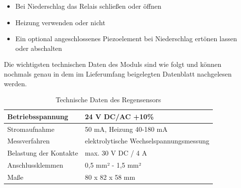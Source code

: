 				\begin{itemize}
					\item Bei Niederschlag das Relais schließen oder öffnen
					\item Heizung verwenden oder nicht
					\item Ein optional angeschlossenes Piezoelement bei Niederschlag ertönen lassen oder abschalten
				\end{itemize}
				
				Die wichtigsten technischen Daten des Moduls sind wie folgt und können nochmals genau in dem im Lieferumfang beigelegten Datenblatt nachgelesen werden.
				
				\begin{table}[H]
					\centering
					\begin{tabular}{|l|l|}
						\hline Betriebsspannung &  24 V DC/AC +10\% \\ 
						\hline Stromaufnahme & 50 mA, Heizung 40-180 mA \\ 
						\hline Messverfahren & elektrolytische Wechselspannungsmessung \\ 
						\hline Belastung der Kontakte & max. 30 V DC / 4 A \\ 
						\hline Anschlussklemmen & 0,5 mm² - 1,5 mm² \\ 
						\hline Maße & 80 x 82 x 58 mm \\
						\hline 
					\end{tabular}
					\caption{Technische Daten des Regensensors}
					\label{table:TechRain}
				\end{table}
				
				\cite{Rain}